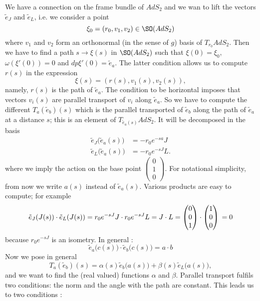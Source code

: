 We have a connection on the frame bundle of $AdS_2$ and we wan to lift the vectors $\tilde{e}_J$ and $\tilde{e}_L$, i.e. we consider a point 
\[ 
  \xi_0=(r_0,v_1,v_2)\in \SO(AdS_2)
\]
where $v_1$ and $v_2$ form an orthonormal (in the sense of $g$) basis of $T_{r_0}AdS_2$. Then we have to find a path $s\to\xi(s)$ in $\SO(AdS_2)$ such that $\xi(0)=\xi_0$, $\omega(\xi'(0))=0$ and $dp\xi'(0)=\tilde{e}_a$. The latter condition allows us to compute $r(s)$ in the expression
\[ 
  \xi(s)=(r(s),v_1(s),v_2(s)),
\]
namely, $r(s)$ is the path of $\tilde{e}_a$. The condition to be horizontal imposes that vectors $v_i(s)$ are parallel transport of $v_i$ along $\tilde{e}_a$. So we have to compute the different $T_a(\tilde{e}_b)(s)$ which is the parallel transported of $\tilde{e}_b$ along the path of $\tilde{e}_a$ at a distance $s$; this is an element of $T_{\tilde{e}_a(s)}AdS_2$. It will be decomposed in the basis 
\[ 
 \begin{split}
  \tilde{e}_J\big( \tilde{e}_a(s) \big)&=-r_0 e^{-s a}J\\
\tilde{e}_L\big( \tilde{e}_a(s) \big)&=-r_0 e^{-sJ}L.
\end{split} 
\]
where we imply the action on the base point $\begin{pmatrix}
0\\1\\0
\end{pmatrix}$. For notational simplicity, from now we write $a(s)$ instead of $\tilde{e}_a(s)$. Various products are easy to compute; for example
\[ 
  \tilde{e}_J(J(s))\cdot\tilde{e}_L(J(s))
        =r_0 e^{-sJ}J\cdot r_0 e^{-sJ}L\\
        =J\cdot L\\
        =\begin{pmatrix}
0\\0\\1
\end{pmatrix}\cdot\begin{pmatrix}
1\\0\\0
\end{pmatrix}\\
        =0
\]
because $r_0 e^{-sJ}$ is an isometry.
In general :
\[ 
  \tilde{e}_a\big( c(s) \big)\cdot \tilde{e}_b\big( c(s) \big)=a\cdot b
\]
Now we pose in general
\[ 
  T_a(\tilde{e}_b)(s)=\alpha(s)\tilde{e}_b\big( a(s) \big)+\beta(s)\tilde{e}_L\big( a(s) \big),
\]
and we want to find the (real valued) functions $\alpha$ and $\beta$. Parallel transport fulfils two conditions: the norm and the angle with the path are constant. This leads us to two conditions :

